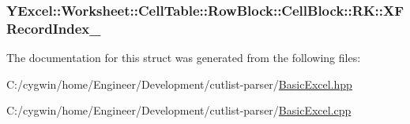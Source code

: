 \subsubsection[{X\+F\+Record\+Index\+\_\+}]{ Y\+Excel\+::\+Worksheet\+::\+Cell\+Table\+::\+Row\+Block\+::\+Cell\+Block\+::\+R\+K\+::\+X\+F\+Record\+Index\+\_\+}\label{struct_y_excel_1_1_worksheet_1_1_cell_table_1_1_row_block_1_1_cell_block_1_1_r_k_a63fd84a79ddf52849c612a06560095e4}


The documentation for this struct was generated from the following files\+:\begin{DoxyCompactItemize}
\item 
C\+:/cygwin/home/\+Engineer/\+Development/cutlist-\/parser/\hyperlink{_basic_excel_8hpp}{Basic\+Excel.\+hpp}\item 
C\+:/cygwin/home/\+Engineer/\+Development/cutlist-\/parser/\hyperlink{_basic_excel_8cpp}{Basic\+Excel.\+cpp}\end{DoxyCompactItemize}
